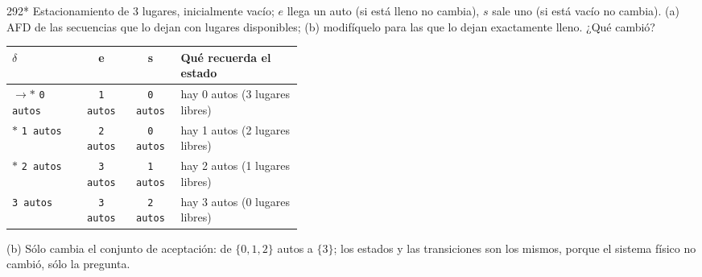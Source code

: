 \documentclass[11pt]{article}
\begin{document}
\begin{ejercicio}{292}{*}
Estacionamiento de 3 lugares, inicialmente vacío; $e$ llega un auto (si está lleno no cambia), $s$ sale uno (si está vacío no cambia). (a) AFD de las secuencias que lo dejan con lugares disponibles; (b) modifíquelo para las que lo dejan exactamente lleno. ¿Qué cambió?
\end{ejercicio}
\proc \begin{center}\small\begin{tabular}{lccp{0.42\linewidth}}\toprule
$\delta$ & e & s & Qué recuerda el estado \\\midrule
$\to$$*$ \texttt{0 autos} & \texttt{1 autos} & \texttt{0 autos} & hay 0 autos (3 lugares libres) \\
$*$ \texttt{1 autos} & \texttt{2 autos} & \texttt{0 autos} & hay 1 autos (2 lugares libres) \\
$*$ \texttt{2 autos} & \texttt{3 autos} & \texttt{1 autos} & hay 2 autos (1 lugares libres) \\
 \texttt{3 autos} & \texttt{3 autos} & \texttt{2 autos} & hay 3 autos (0 lugares libres) \\
\bottomrule\end{tabular}\end{center}

\resp (b) Sólo cambia el conjunto de aceptación: de $\{0, 1, 2\}$ autos a $\{3\}$; los estados y las transiciones son los mismos, porque el sistema físico no cambió, sólo la pregunta.
\end{document}
